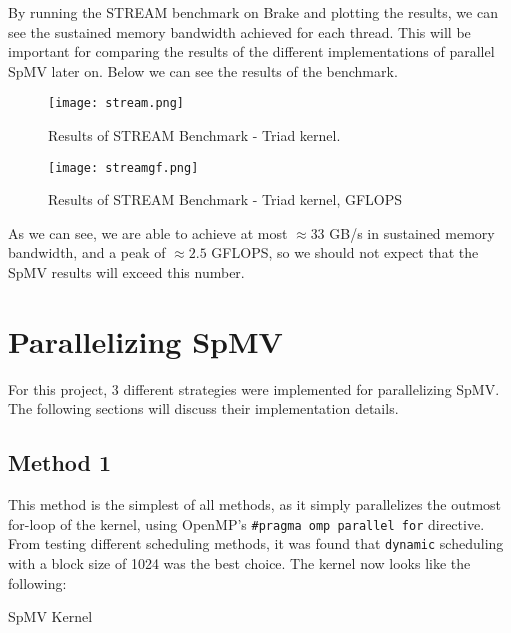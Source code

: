 \documentclass{article}
\begin{document}
    By running the STREAM benchmark on Brake and plotting the results, we can see the sustained memory bandwidth achieved for each thread. This will be important for comparing the results of the different implementations of parallel SpMV later on. Below we can see the results of the benchmark.

    \begin{figure}[H]
        \begin{center}
            \texttt{[image: stream.png]}
        \end{center}
        \caption{Results of STREAM Benchmark - Triad kernel.}
    \end{figure}
    \begin{figure}[H]
        \begin{center}
            \texttt{[image: streamgf.png]}
        \end{center}
        \caption{Results of STREAM Benchmark - Triad kernel, GFLOPS}
    \end{figure}

    As we can see, we are able to achieve at most \( \approx 33 \) GB/s in sustained memory bandwidth, and a peak of \( \approx 2.5 \) GFLOPS, so we should not expect that the SpMV results will exceed this number.


    \section{Parallelizing SpMV}

    For this project, 3 different strategies were implemented for parallelizing SpMV. The following sections will discuss their implementation details. 

    \subsection{Method 1}

    This method is the simplest of all methods, as it simply parallelizes the outmost for-loop of the kernel, using OpenMP's \texttt{\#pragma omp parallel for} directive. From testing different scheduling methods, it was found that \texttt{dynamic} scheduling with a block size of 1024 was the best choice. The kernel now looks like the following:
    \medskip


    \begin{algorithm}[H]
        \caption{SpMV Kernel}
        \SetAlgoVlined

    \end{algorithm}
\end{document}
